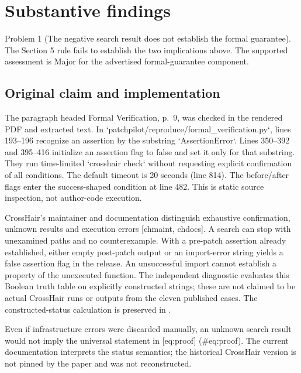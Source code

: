 \documentclass[10pt]{article}
\begin{document}
\section*{Substantive findings}
Problem 1 (The negative search result does not establish the formal guarantee).  The Section 5 rule fails to establish the two implications above. The supported assessment is Major for the advertised formal-guarantee component.\par
\subsection*{Original claim and implementation}
The paragraph headed Formal Verification, p. 9, was checked in the rendered PDF and extracted text. In `patchpilot/reproduce/formal\_verification.py`, lines 193–196 recognize an assertion by the substring `AssertionError`. Lines 350–392 and 395–416 initialize an assertion flag to false and set it only for that substring. They run time-limited `crosshair check` without requesting explicit confirmation of all conditions. The default timeout is 20 seconds (line 814). The before/after flags enter the success-shaped condition at line 482. This is static source inspection, not author-code execution.\par
CrossHair’s maintainer and documentation distinguish exhaustive confirmation, unknown results and execution errors [chmaint, chdocs]. A search can stop with unexamined paths and no counterexample. With a pre-patch assertion already established, either empty post-patch output or an import-error string yields a false assertion flag in the release. An unsuccessful import cannot establish a property of the unexecuted function. The independent diagnostic evaluates this Boolean truth table on explicitly constructed strings; these are not claimed to be actual CrossHair runs or outputs from the eleven published cases. The constructed-status calculation is preserved in .\par
Even if infrastructure errors were discarded manually, an unknown search result would not imply the universal statement in [eq:proof] (\#eq:proof). The current documentation interprets the status semantics; the historical CrossHair version is not pinned by the paper and was not reconstructed.\par
\end{document}
